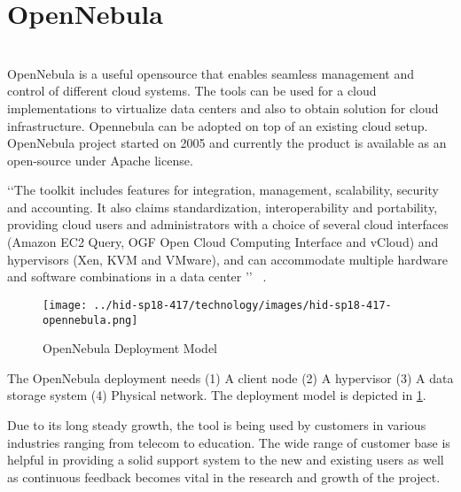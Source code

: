
\section{OpenNebula}
\\
OpenNebula is a useful opensource that enables seamless management and control of different cloud systems.
The tools can be used for a cloud implementations 
to virtualize data centers and also to obtain solution for cloud infrastructure.
Opennebula can be adopted on top of an existing cloud setup.
OpenNebula project started on 2005 and currently the product is available as an open-source under Apache license. 

‘‘The toolkit includes features for integration, management, scalability, security and accounting.
It also claims standardization, interoperability and portability, providing cloud users and administrators with a choice of several
cloud interfaces (Amazon EC2 Query, OGF Open Cloud Computing Interface and vCloud) and hypervisors
(Xen, KVM and VMware), and can accommodate multiple hardware and software combinations in a data center ’’
~\cite{hid-sp18-417-opennebula-wiki}.

\begin{figure}[htb]
\texttt{[image: ../hid-sp18-417/technology/images/hid-sp18-417-opennebula.png]}
\caption{OpenNebula Deployment Model ~\cite{hid-sp18-417-opennebula-deployment}} 
\label{F:opennebula}
\end{figure}

The OpenNebula deployment needs (1) A client node (2) A hypervisor (3) A data storage system (4) Physical network. The deployment model is depicted in \ref{F:opennebula}.

Due to its long steady growth, the tool is being used by customers in various industries ranging from telecom to education.
The wide range of customer base is helpful in providing a solid support system to the new and existing users as well as continuous feedback becomes vital in the research and growth of the project. 

